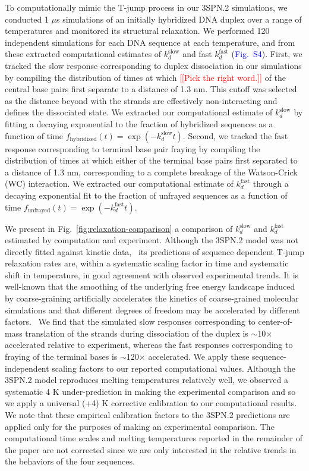 \documentclass[journal=jpcbfk,manuscript=article]{achemso}
\newcommand*{\rood}[1]{{\color{red}{#1}}}
\newcommand*{\blauw}[1]{\textcolor{blue}{#1}}
\newcommand*{\noter}[1]{\textcolor{red}{[[#1]]}}		%
\begin{document}
To computationally mimic the T-jump process in our 3SPN.2 simulations, we conducted 1 $\mu$s simulations of an initially hybridized DNA duplex over a range of temperatures and monitored its structural relaxation. We performed 120 independent simulations for each DNA sequence at each temperature, and from these extracted computational estimates of $k_d^\mathrm{slow}$ and fast $k_d^\mathrm{fast}$ (\blauw{Fig.~S4}). First, we tracked the slow response corresponding to duplex dissociation in our simulations by compiling the distribution of times at which \rood{both OR either} \noter{Pick the right word.} of the central base pairs first separate to a distance of 1.3 nm. This cutoff was selected as the distance beyond with the strands are effectively non-interacting and defines the dissociated state. We extracted our computational estimate of $k_d^\mathrm{slow}$ by fitting a decaying exponential to the fraction of hybridized sequences as a function of time $f_\mathrm{hybridized}(t) = \exp(-k_d^\mathrm{slow}t)$. Second, we tracked the fast response corresponding to terminal base pair fraying by compiling the distribution of times at which either of the terminal base pairs first separated to a distance of 1.3 nm, corresponding to a complete breakage of the Watson-Crick (WC) interaction. We extracted our computational estimate of $k_d^\mathrm{fast}$ through a decaying exponential fit to the fraction of unfrayed sequences as a function of time $f_\mathrm{unfrayed}(t) = \exp(-k_d^\mathrm{fast}t)$. 

We present in Fig.~\ref{fig:relaxation-comparison} a comparison of $k_d^\mathrm{slow}$ and $k_d^\mathrm{fast}$ estimated by computation and experiment. Although the 3SPN.2 model was not directly fitted against kinetic data,~\cite{Hinckley2013AnHybridization} its predictions of sequence dependent T-jump relaxation rates are, within a systematic scaling factor in time and systematic shift in temperature, in good agreement with observed experimental trends. It is well-known that the smoothing of the underlying free energy landscape induced by coarse-graining artificially accelerates the kinetics of coarse-grained molecular simulations and that different degrees of freedom may be accelerated by different factors.~\citep{Marrink2007TheSimulations, Fritz2011MultiscaleDynamics, Marrink2013PerspectiveModel} We find that the simulated slow responses corresponding to center-of-mass translation of the strands during dissociation of the duplex is $\sim$10$\times$ accelerated relative to experiment, whereas the fast responses corresponding to fraying of the terminal bases is $\sim$120$\times$ accelerated. We apply these sequence-independent scaling factors to our reported computational values. Although the 3SPN.2 model reproduces melting temperatures relatively well, we observed a systematic 4 K under-prediction in making the experimental comparison and so we apply a universal (+4) K corrective calibration to our computational results. We note that these empirical calibration factors to the 3SPN.2 predictions are applied only for the purposes of making an experimental comparison. The computational time scales and melting temperatures reported in the remainder of the paper are not corrected since we are only interested in the relative trends in the behaviors of the four sequences.
\end{document}
